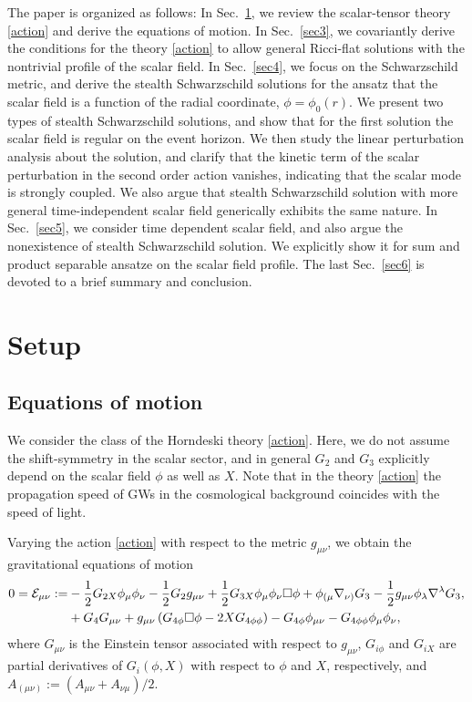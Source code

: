 \documentclass[prd,amsmath,amssymb,floatfix,superscriptaddress,notitlepage,nofootinbib,preprintnumbers]{revtex4-1}
\begin{document}
The paper is organized as follows:
In Sec.~\ref{sec2}, we review the scalar-tensor theory \eqref{action}
and derive the equations of motion. 
In Sec.~\ref{sec3}, we covariantly derive the conditions 
for the theory \eqref{action} to allow general Ricci-flat solutions with 
the nontrivial profile of the scalar field.
In Sec.~\ref{sec4}, we focus on the Schwarzschild metric,
and derive the stealth Schwarzschild solutions
for the ansatz that the scalar field is a function of the radial coordinate, $\phi=\phi_0(r)$.
We present two types of stealth Schwarzschild solutions, 
and show that for the first solution the scalar field is regular on the event horizon.
We then study the linear perturbation analysis about the solution, 
and clarify that
the kinetic term of the scalar perturbation in the second order action vanishes, 
indicating that the scalar mode is strongly coupled.
We also argue that stealth Schwarzschild solution with more general time-independent scalar field 
generically exhibits the same nature.
In Sec.~\ref{sec5}, we consider time dependent scalar field, and
also argue the nonexistence of stealth Schwarzschild solution. 
We explicitly show it for sum and product separable ansatze on the scalar field profile.
The last Sec.~\ref{sec6} is devoted to a brief summary and conclusion.



\section{Setup}
\label{sec2}


\subsection{Equations of motion}
\label{sec21}

We consider the class of the Horndeski theory \eqref{action}.
Here, 
we do not assume the shift-symmetry in the scalar sector,
and in general $G_2$ and $G_3$ explicitly depend 
on the scalar field $\phi$ as well as $X$.
Note that 
in the theory \eqref{action}
the propagation speed of GWs
in the cosmological background
coincides with the speed of light.


Varying the action \eqref{action} with respect to the metric $g_{\mu\nu}$,
we obtain the gravitational equations of motion 
\begin{align}
\label{grav}
0
={\cal E}_{\mu\nu}
:=
&
-\frac{1}{2}G_{2X}\phi_\mu\phi_\nu
 -\frac{1}{2} G_2 g_{\mu\nu}
 +\frac{1}{2}G_{3X}\phi_\mu\phi_\nu\Box\phi 
 + \phi_{(\mu} \nabla_{\nu)} G_3 
 -\frac{1}{2}g_{\mu\nu} \phi_\lambda \nabla^\lambda G_3,
\nonumber\\
&+G_4 G_{\mu\nu} 
 +g_{\mu\nu} \left(G_{4\phi}\Box \phi -2X G_{4\phi\phi}\right)
 -G_{4\phi}\phi_{\mu\nu}
 -G_{4\phi\phi}\phi_\mu\phi_\nu,
\end{align}
where $G_{\mu\nu}$ is the Einstein tensor associated with respect to $g_{\mu\nu}$,
$G_{i\phi}$ and $G_{iX}$ are partial derivatives of $G_i(\phi,X)$
with respect to $\phi$ and $X$, respectively,
and $A_{(\mu\nu)}:=(A_{\mu\nu}+A_{\nu\mu})/2$.
\end{document}
